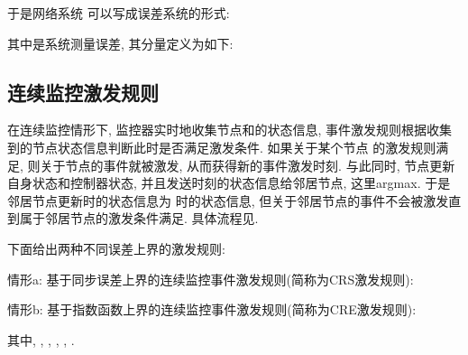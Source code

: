        于是网络系统  可以写成误差系统的形式:
        \begin{comment}\label{sys:all}
        \dot{e}(t)=f(e(t))-\theta(t)\rho(t)[L(r_{t})\otimes\Gamma]h(e(t))-\tau \rho(t)[D(r_{t})\otimes\Gamma] h(e(t))+\rho(t)\tilde{e}(t),
        \end{comment}
       其中是系统测量误差, 其分量定义为如下:
        \begin{comment}
        \nonumber \tilde{e}_{i}(t)=&\theta(t)\sum^{N}_{j=1}l_{ij}(r_{t})\Gamma[h(x_{j}(t))-h(x_{j}(t_{k}^{i}))]\\
        &-\tau d_{i}(r_{t})[h(x_{i}(t))-h(x_{i}(t_{k}^{i}))+h(s(t_{k}^{i}))-h(s(t))].
        \end{comment}
\subsection{连续监控激发规则}
    在连续监控情形下, 监控器实时地收集节点和的状态信息, 事件激发规则根据收集到的节点状态信息判断此时是否满足激发条件. 如果关于某个节点 的激发规则满足, 则关于节点的事件就被激发, 从而获得新的事件激发时刻. 与此同时, 节点更新自身状态和控制器状态, 并且发送时刻的状态信息给邻居节点, 这里argmax. 于是邻居节点更新时的状态信息为 时的状态信息, 但关于邻居节点的事件不会被激发直到属于邻居节点的激发条件满足. 具体流程见.
    \begin{comment}[!htp]
    \setlength{\abovecaptionskip}{-1cm}
     \begin{center}
           {\texttt{[image: nonlinear/flowchartcon1.png]}}
     \end{center}
  \caption{连续监控下事件激发牵制控制流程图}\label{cflowchart}
    \end{comment}

    下面给出两种不同误差上界的激发规则:

           情形a: 基于同步误差上界的连续监控事件激发规则(简称为CRS激发规则):
            \begin{comment}\label{crule:1}
            t^{i}_{k+1}=\max\left\{t\geq t^{i}_{k}: \|\tilde{e}_{i}(t)\| \leq\omega \| e_{i}(t)\|\right\}
            \end{comment}

            情形b: 基于指数函数上界的连续监控事件激发规则(简称为CRE激发规则):
            \begin{comment}\label{crule:2}
             t^{i}_{k+1}=\max\left\{t\geq t^{i}_{k}: \|\tilde{e}_{i}(t)\| \leq ae^{-bt}\right\}
             \end{comment}
           其中, , , ,
              , .

